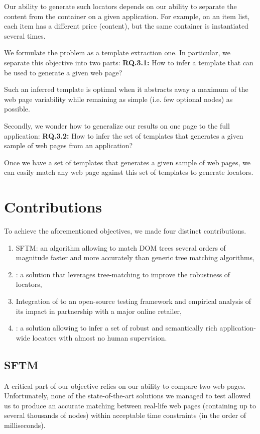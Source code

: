 Our ability to generate such locators depends on our ability to separate the content from the container on a given application. For example, on an item list, each item has a different price (content), but the same container is instantiated several times.

We formulate the problem as a template extraction one.
In particular, we separate this objective into two parts:
\textbf{RQ.3.1:} How to infer a template that can be used to generate a given web page?

Such an inferred template is optimal when it abstracts away a maximum of the web page variability while remaining as simple (i.e. few optional nodes) as possible. 

Secondly, we wonder how to generalize our results on one page to the full application:
\textbf{RQ.3.2:} How to infer the set of templates that generates a given sample of web pages from an application?

Once we have a set of templates that generates a given sample of web pages, we can easily match any web page against this set of templates to generate locators.

\section{Contributions}
To achieve the aforementioned objectives, we made four distinct contributions.

\begin{enumerate}
\item SFTM: an algorithm allowing to match DOM trees several orders of magnitude faster and more accurately than generic tree matching algorithms,
\item \erratum{}: a solution that leverages tree-matching to improve the robustness of locators,
\item Integration of \erratum{} to an open-source testing framework and empirical analysis of its impact in partnership with a major online retailer,
\item \appstract{}: a solution allowing to infer a set of robust and semantically rich application-wide locators with almost no human supervision.
\end{enumerate}

\subsection{SFTM}
A critical part of our objective relies on our ability to compare two web pages.
Unfortunately, none of the state-of-the-art solutions we managed to test allowed us to produce an accurate matching between real-life web pages (containing up to several thousands of nodes) within acceptable time constraints (in the order of milliseconds).

